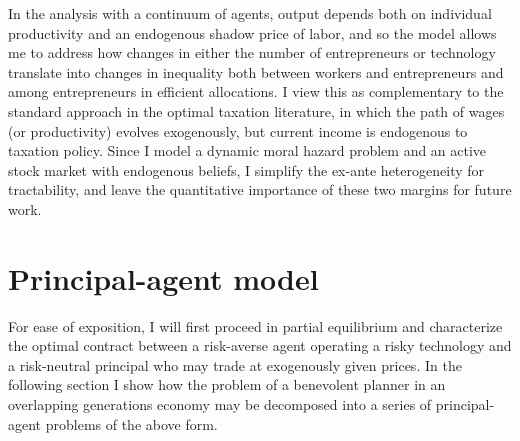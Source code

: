 \documentclass[11pt]{article}
\theoremstyle{plain}
\begin{document}
In the analysis with a continuum of agents, output depends both on individual productivity and an endogenous shadow price of labor, and so the model allows me to address how changes in either the number of entrepreneurs or technology translate into changes in inequality both between workers and entrepreneurs and among entrepreneurs in efficient allocations. I view this as complementary to the standard approach in the optimal taxation literature, in which the path of wages (or productivity) evolves exogenously, but current income is endogenous to taxation policy. Since I model a dynamic moral hazard problem and an active stock market with endogenous beliefs, I simplify the ex-ante heterogeneity for tractability, and leave the quantitative importance of these two margins for future work. 


\section{Principal-agent model} \label{PriAg}

For ease of exposition, I will first proceed in partial equilibrium and characterize the optimal contract between a risk-averse agent operating a risky technology and a risk-neutral principal who may trade at exogenously given prices. In the following section I show how the problem of a benevolent planner in an overlapping generations economy may be decomposed into a series of principal-agent problems of the above form.

\end{document}
